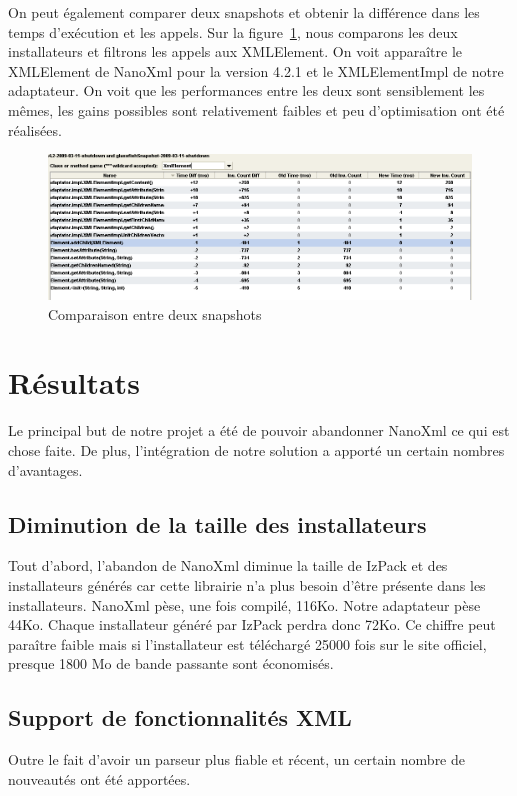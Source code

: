 On peut également comparer deux snapshots et obtenir la différence dans les temps d'exécution et les appels.
Sur la figure~\ref{fig:yourkitComparaison}, nous comparons les deux installateurs et filtrons les appels aux XMLElement.
On voit apparaître le XMLElement de NanoXml pour la version 4.2.1 et le XMLElementImpl de notre adaptateur.
On voit que les performances entre les deux sont sensiblement les mêmes, les gains possibles sont relativement faibles et peu d'optimisation ont été réalisées.
\begin{figure}[H]
	\centering
	\includegraphics[width=1\textwidth]{../image/yourkitComparaison.png}
	\caption{Comparaison entre deux snapshots}
	\label{fig:yourkitComparaison}
\end{figure}

\section{Résultats}
Le principal but de notre projet a été de pouvoir abandonner NanoXml ce qui est chose faite.
De plus, l'intégration de notre solution a apporté un certain nombres d'avantages.
\subsection{Diminution de la taille des installateurs}
Tout d'abord, l'abandon de NanoXml diminue la taille de IzPack et des installateurs générés car cette librairie n'a plus besoin d'être présente dans les installateurs.
NanoXml pèse, une fois compilé, 116Ko.
Notre adaptateur pèse 44Ko.
Chaque installateur généré par IzPack perdra donc 72Ko.
Ce chiffre peut paraître faible mais si l'installateur est téléchargé 25000 fois sur le site officiel, presque 1800 Mo de bande passante sont économisés.
\subsection{Support de fonctionnalités XML}
Outre le fait d'avoir un parseur plus fiable et récent, un certain nombre de nouveautés ont été apportées.
